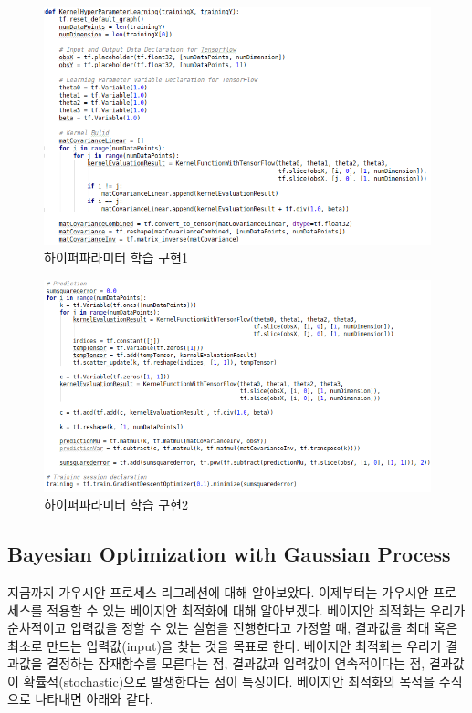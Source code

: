 \documentclass[a4paper]{oblivoir}
\begin{document}
\begin{figure}[ht] \centering 
\includegraphics[scale=0.6]{fig12_17.png} 
\caption{하이퍼파라미터 학습 구현1}
\label{fig:12-18}
\end{figure}

\begin{figure}[ht] \centering 
\includegraphics[scale=0.6]{fig12_19.png} 
\caption{하이퍼파라미터 학습 구현2}
\label{fig:12-19}
\end{figure}

\subsection{Bayesian Optimization with Gaussian Process}

지금까지 가우시안 프로세스 리그레션에 대해 알아보았다. 이제부터는 가우시안 프로세스를 적용할 수 있는 베이지안 최적화에 대해 알아보겠다. 베이지안 최적화는 우리가 순차적이고 입력값을 정할 수 있는 실험을 진행한다고 가정할 때, 결과값을 최대 혹은 최소로 만드는 입력값(input)을 찾는 것을 목표로 한다. 베이지안 최적화는 우리가 결과값을 결정하는 잠재함수를 모른다는 점, 결과값과 입력값이 연속적이다는 점, 결과값이 확률적(stochastic)으로 발생한다는 점이 특징이다. 베이지안 최적화의 목적을 수식으로 나타내면 아래와 같다.
\end{document}
